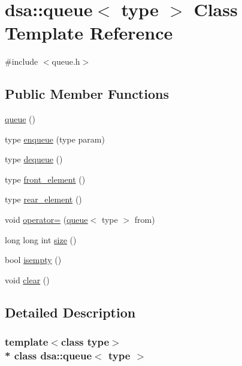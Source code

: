 \hypertarget{classdsa_1_1queue}{}\section{dsa\+:\+:queue$<$ type $>$ Class Template Reference}
\label{classdsa_1_1queue}


{\ttfamily \#include $<$queue.\+h$>$}

\subsection*{Public Member Functions}
\begin{DoxyCompactItemize}
\item 
\hyperlink{classdsa_1_1queue_af743931a98548dc02b4832e4cc046ae3}{queue} ()
\item 
type \hyperlink{classdsa_1_1queue_af66c3129f96357af900032b83079b20e}{enqueue} (type param)
\item 
type \hyperlink{classdsa_1_1queue_a332155c1b5d709b703302e4300c62157}{dequeue} ()
\item 
type \hyperlink{classdsa_1_1queue_a9d1178866d2b787aa7947619694ae654}{front\+\_\+element} ()
\item 
type \hyperlink{classdsa_1_1queue_a0f31a67ad76c1b586fead082e9c5c6fc}{rear\+\_\+element} ()
\item 
void \hyperlink{classdsa_1_1queue_a981c9ebdbfafccbc2b7a7b1ee6a90445}{operator=} (\hyperlink{classdsa_1_1queue}{queue}$<$ type $>$ from)
\item 
long long int \hyperlink{classdsa_1_1queue_aa7daee593691f3faa0588744c911bbba}{size} ()
\item 
bool \hyperlink{classdsa_1_1queue_aacb170201d811e7d3329c84334fc6de3}{isempty} ()
\item 
void \hyperlink{classdsa_1_1queue_abf2014a47be40bf2d0ff7803a3c5165b}{clear} ()
\end{DoxyCompactItemize}


\subsection{Detailed Description}
\subsubsection*{template$<$class type$>$\\*
class dsa\+::queue$<$ type $>$}



